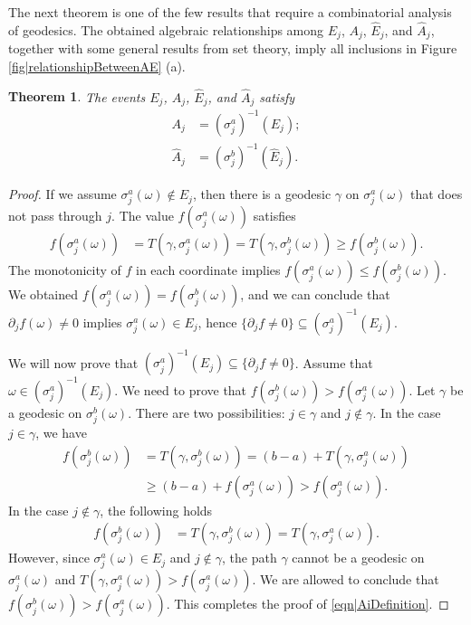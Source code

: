 \documentclass[reqno]{amsart}
\newtheorem{theorem}{Theorem}
\begin{document}
The next theorem is one of the few results that require a combinatorial analysis of geodesics. The obtained algebraic relationships among $E_j$, $A_j$, $\hat E_j$, and $\hat A_j$, together with some general results from set theory, imply all inclusions in Figure \ref{fig|relationshipBetweenAE} (a).

\begin{theorem}\label{thm|AiDefinition} The events $E_j$, $A_j$, $\hat E_j$, and $\hat A_j$ satisfy
\begin{align}
 A_j&=(\sigma_j^a)^{-1}\left(E_j\right); \label{eqn|AiDefinition}\\
 \hat A_j&=(\sigma_j^b)^{-1}(\hat E_j). \label{eqn|HatAiDefinition}
\end{align}
\end{theorem}
\begin{proof} 
If we assume $ \sigma_j^a (\omega)\not \in E_j$, then there is a geodesic $\gamma$ on $\sigma_j^a(\omega)$ that does not pass through $j$. The value $f(\sigma_j^a(\omega))$ satisfies 
\begin{align*}
f(\sigma_j^a(\omega))&=T(\gamma,\sigma_j^a(\omega))=T(\gamma,\sigma_j^b(\omega))\geq f(\sigma_j^b(\omega)).
\end{align*} The monotonicity of $f$ in each coordinate implies $f(\sigma_j^a(\omega))\leq f(\sigma_j^b(\omega))$. We obtained $f(\sigma_j^a(\omega))= f(\sigma_j^b(\omega))$, and we can conclude that
 $\partial_jf(\omega)\neq 0$ implies $\sigma_j^a(\omega)\in E_j$, hence  $\{\partial_jf\neq 0\}\subseteq (\sigma_j^a)^{-1}(E_j)$.

 

We will now prove that $(\sigma_j^a)^{-1}(E_j)\subseteq\{\partial_jf\neq 0\}$. Assume that $\omega\in (\sigma_j^a)^{-1}(E_j)$. We need to prove that $f(\sigma_j^b(\omega))>f(\sigma_j^a(\omega))$.  Let $\gamma$ be a geodesic on $\sigma_j^b(\omega)$. There are two possibilities: $j\in \gamma$ and $j\not\in \gamma$. In the case $j\in \gamma$, we have
\begin{align*}
f(\sigma_j^b(\omega))&=T(\gamma,\sigma_j^b(\omega))=(b-a)+T(\gamma,\sigma_j^a(\omega))\\
&\geq (b-a)+f(\sigma_j^a(\omega)) >f(\sigma_j^a(\omega)).
\end{align*}
In the case $j\not \in \gamma$, the following holds
\begin{align*}
f(\sigma_j^b(\omega))&= T(\gamma,\sigma_j^b(\omega))=T(\gamma,\sigma_j^a(\omega)).
\end{align*}
However, since $\sigma_j^a(\omega)\in E_j$ and $j\not\in \gamma$, the path $\gamma$ cannot be a geodesic on $\sigma_j^a(\omega)$ and 
$T(\gamma,\sigma_j^a(\omega))>f(\sigma_j^a(\omega))$. We are allowed to conclude that $f(\sigma_j^b(\omega))>f(\sigma_j^a(\omega))$. 
This completes the proof of \eqref{eqn|AiDefinition}.


\end{proof}
\end{document}
